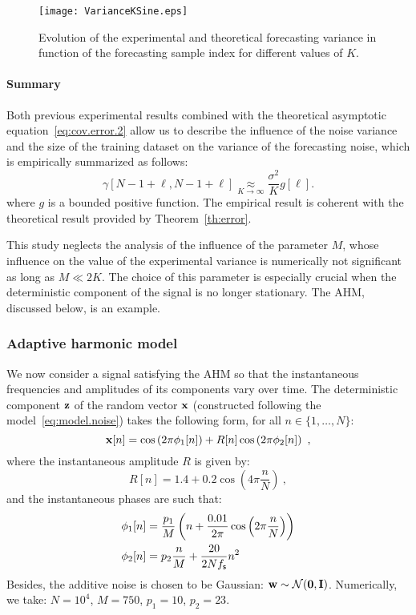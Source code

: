 \begin{figure}
\texttt{[image: VarianceKSine.eps]}
\caption{Evolution of the experimental and theoretical forecasting variance in function of the forecasting sample index for different values of $K$.}
\label{fig:res.size.sine}
\end{figure}

\paragraph{Summary}
Both previous experimental results combined with the theoretical asymptotic equation~\eqref{eq:cov.error.2} allow us to describe the influence of the noise variance and the size of the training dataset on the variance of the forecasting noise, which is empirically summarized as follows:
\begin{equation}
\gamma[N-1+\ell,N-1+\ell] \underset{K\to\infty}{\approx} \dfrac{\sigma^2}{K}g[\ell] .
\end{equation} 
where $g$ is a bounded positive function. The empirical result is coherent with the theoretical result provided by Theorem~\ref{th:error}.

This study neglects the analysis of the influence of the parameter $M$, whose influence on the value of the experimental variance is numerically not significant as long as $M\ll 2K$. The choice of this parameter is especially crucial when the deterministic component of the signal is no longer stationary. The AHM, discussed below, is an example.

\subsubsection{Adaptive harmonic model}
\label{ssse:res.ahm}
We now consider a signal satisfying the AHM so that the instantaneous frequencies and amplitudes of its components vary over time. The deterministic component ${\mathbf z}$ of the random vector ${\mathbf x}$ (constructed following the model~\eqref{eq:model.noise}) takes the following form, for all $n\in\{1,\ldots,N\}$:
\[
{\mathbf x}[n] = \cos\left(2\pi \phi_1[n] \right) + R[n]\cos\left(2\pi \phi_2[n] \right) \ ,
\] 
where the instantaneous amplitude $R$ is given by:
\[
R[n] = 1.4 + 0.2\cos\left(4\pi\frac{n}{N}\right)\ ,
\]
and the instantaneous phases are such that:
\begin{align*}
\phi_1[n] &= \frac{p_1}{M}\left( n + \frac{0.01}{2\pi}\cos\left(2\pi\frac{n}{N}\right) \right) \\
\phi_2[n] & = p_2\frac{n}{M} + \frac{20}{2Nf_{\mathsf s}}n^2
\end{align*}
Besides, the additive noise is chosen to be Gaussian: ${\mathbf w}\sim{\mathcal N}(\boldsymbol{0},{\mathbf I})$. Numerically, we take: $N=10^4$, $M=750$, $p_1=10$, $p_2=23$.

